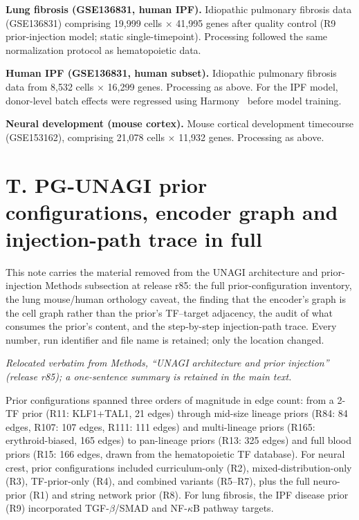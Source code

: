 \documentclass[11 pt,a4 paper]{article}
\begin{document}
\textbf{Lung fibrosis (GSE136831, human IPF).} Idiopathic pulmonary fibrosis data (GSE136831) comprising 19,999 cells $\times$ 41,995 genes after quality control (R9 prior-injection model; static single-timepoint). Processing followed the same normalization protocol as hematopoietic data.

\textbf{Human IPF (GSE136831, human subset).} Idiopathic pulmonary fibrosis data from 8,532 cells $\times$ 16,299 genes. Processing as above. For the IPF model, donor-level batch effects were regressed using Harmony~\cite{korsunsky2019} before model training.

\textbf{Neural development (mouse cortex).} Mouse cortical development timecourse (GSE153162), comprising 21,078 cells $\times$ 11,932 genes. Processing as above.


\clearpage

\section*{T. PG-UNAGI prior configurations, encoder graph and injection-path trace in full}

This note carries the material removed from the UNAGI architecture and prior-injection Methods subsection at release r85: the full prior-configuration inventory, the lung mouse/human orthology caveat, the finding that the encoder's graph is the cell graph rather than the prior's TF--target adjacency, the audit of what consumes the prior's content, and the step-by-step injection-path trace. Every number, run identifier and file name is retained; only the location changed.

\noindent\emph{Relocated verbatim from Methods, ``UNAGI architecture and prior injection'' (release r85); a one-sentence summary is retained in the main text.}

Prior configurations spanned three orders of magnitude in edge count: from a 2-TF prior (R11: KLF1+TAL1, 21 edges) through mid-size lineage priors (R84: 84 edges, R107: 107 edges, R111: 111 edges) and multi-lineage priors (R165: erythroid-biased, 165 edges) to pan-lineage priors (R13: 325 edges) and full blood priors (R15: 166 edges, drawn from the hematopoietic TF database). For neural crest, prior configurations included curriculum-only (R2), mixed-distribution-only (R3), TF-prior-only (R4), and combined variants (R5--R7), plus the full neuro-prior (R1) and string network prior (R8). For lung fibrosis, the IPF disease prior (R9) incorporated TGF-$\beta$/SMAD and NF-$\kappa$B pathway targets.
\end{document}
